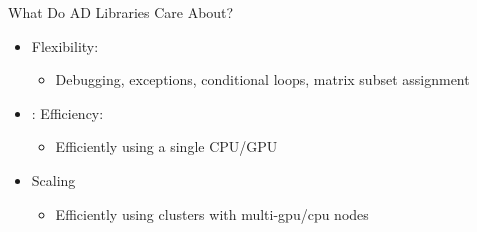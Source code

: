 \documentclass[dvipsnames]{beamer}
\makeatletter
\def\mathcolor#1#{\@mathcolor{#1}}
\def\@mathcolor#1#2#3{%
  \protect\leavevmode
  \begingroup
    \color#1{#2}#3%
  \endgroup
}
\newcommand{\pp}[2]{\frac{\partial#1}{\partial#2}}
\newcommand{\adj}[1]{\bar{#1}}
\makeatother
\begin{document}

\begin{frame}{What Do AD Libraries Care About?}
    \begin{itemize}
        \item Flexibility:
         \begin{itemize}
             \item Debugging, exceptions, conditional loops, matrix subset assignment
         \end{itemize}
         \item: Efficiency:
         \begin{itemize}
             \item Efficiently using a single CPU/GPU
         \end{itemize}
         \item Scaling
         \begin{itemize}
             \item Efficiently using clusters with multi-gpu/cpu nodes
         \end{itemize}
    \end{itemize}
\end{frame}
\end{document}
